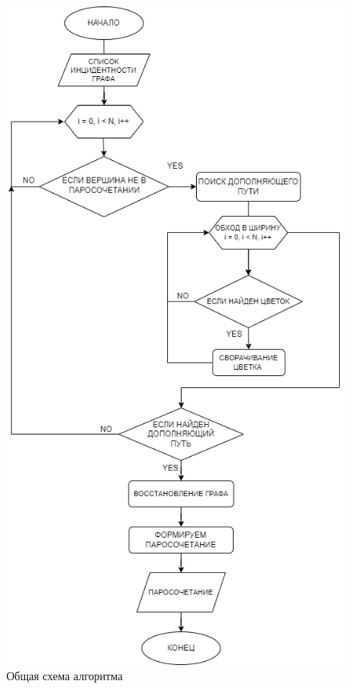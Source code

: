 \documentclass[14pt, a4paper]{extarticle}
\begin{document}
    \begin{figure}[h!]
        \centering
        \includegraphics[scale=0.6]{block schema.png}
        \caption{Общая схема алгоритма}
        \label{fig:my_label}
    \end{figure}

    \pagebreak
    
\end{document}
